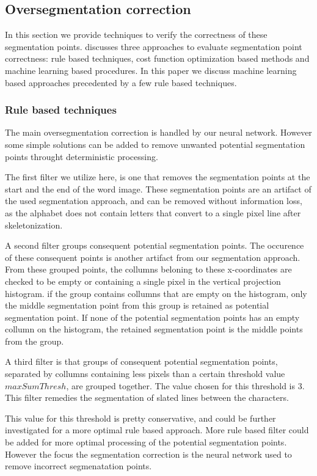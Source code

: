 \documentclass{article}
\begin{document}
\subsection{Oversegmentation correction}
In this section we provide techniques to verify the correctness of these segmentation points.
\cite{evalsplitpoints} discusses three approaches to evaluate segmentation point correctness: rule based techniques, cost function optimization based methods and machine learning based procedures.
In this paper we discuss machine learning based approaches precedented by a few rule based techniques.

\subsubsection{Rule based techniques}
The main oversegmentation correction is handled by our neural network.
However some simple solutions can be added to remove unwanted potential segmentation points throught deterministic processing.

The first filter we utilize here, is one that removes the segmentation points at the start and the end of the word image.
These segmentation points are an artifact of the used segmentation approach, and can be removed without information loss, as the alphabet does not contain letters that convert to a single pixel line after skeletonization.

A second filter groups consequent potential segmentation points.
The occurence of these consequent points is another artifact from our segmentation approach.
From these grouped points, the collumns beloning to these x-coordinates are checked to be empty or containing a single pixel in the vertical projection histogram.
if the group contains collumns that are empty on the histogram, only the middle segmentation point from this group is retained as potential segmentation point.
If none of the potential segmentation points has an empty collumn on the histogram, the retained segmentation point is the middle points from the group.

A third filter is that groups of consequent potential segmentation points, separated by collumns containing less pixels than a certain threshold value $maxSumThresh$, are grouped together.
The value chosen for this threshold is 3.
This filter remedies the segmentation of slated lines between the characters.

This value for this threshold is pretty conservative, and could be further investigated for a more optimal rule based approach.
More rule based filter could be added for more optimal processing of the potential segmentation points.
However the focus the segmentation correction is the neural network used to remove incorrect segmenatation points.
\end{document}

